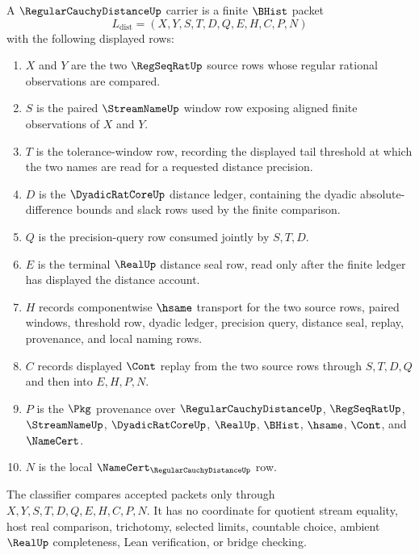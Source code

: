 \begin{definition}
\label{def:regular-cauchy-distance-carrier}
A $\RegularCauchyDistanceUp$ carrier is a finite $\BHist$ packet
$$
L_{\mathrm{dist}}=(X,Y,S,T,D,Q,E,H,C,P,N)
$$
with the following displayed rows:
\begin{enumerate}
\item $X$ and $Y$ are the two $\RegSeqRatUp$ source rows whose regular rational observations are compared.
\item $S$ is the paired $\StreamNameUp$ window row exposing aligned finite observations of $X$ and $Y$.
\item $T$ is the tolerance-window row, recording the displayed tail threshold at which the two names are read for a requested distance precision.
\item $D$ is the $\DyadicRatCoreUp$ distance ledger, containing the dyadic absolute-difference bounds and slack rows used by the finite comparison.
\item $Q$ is the precision-query row consumed jointly by $S,T,D$.
\item $E$ is the terminal $\RealUp$ distance seal row, read only after the finite ledger has displayed the distance account.
\item $H$ records componentwise $\hsame$ transport for the two source rows, paired windows, threshold row, dyadic ledger, precision query, distance seal, replay, provenance, and local naming rows.
\item $C$ records displayed $\Cont$ replay from the two source rows through $S,T,D,Q$ and then into $E,H,P,N$.
\item $P$ is the $\Pkg$ provenance over $\RegularCauchyDistanceUp$, $\RegSeqRatUp$, $\StreamNameUp$, $\DyadicRatCoreUp$, $\RealUp$, $\BHist$, $\hsame$, $\Cont$, and $\NameCert$.
\item $N$ is the local $\NameCert_{\RegularCauchyDistanceUp}$ row.
\end{enumerate}
The classifier compares accepted packets only through $X,Y,S,T,D,Q,E,H,C,P,N$. It has no coordinate for quotient stream equality, host real comparison, trichotomy, selected limits, countable choice, ambient $\RealUp$ completeness, Lean verification, or bridge checking.
\end{definition}

